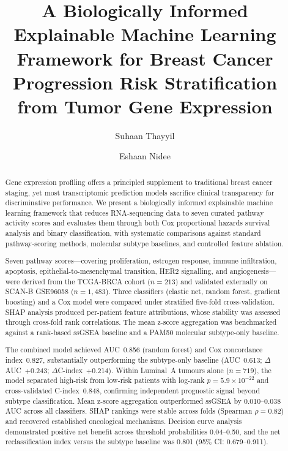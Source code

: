 \documentclass[review,12pt]{elsarticle}
\begin{document}
\begin{frontmatter}
\sloppy

\title{A Biologically Informed Explainable Machine Learning Framework
for Breast Cancer Progression Risk Stratification from Tumor
Gene Expression}

\author[1]{Suhaan Thayyil}

\author[2]{Eshaan Nidee}




\begin{abstract}
Gene expression profiling offers a principled supplement to traditional
breast cancer staging, yet most transcriptomic prediction models sacrifice
clinical transparency for discriminative performance.  We present a
biologically informed explainable machine learning framework that
reduces RNA-sequencing data to seven curated pathway activity scores and
evaluates them through both Cox proportional hazards survival analysis
and binary classification, with systematic comparisons against standard
pathway-scoring methods, molecular subtype baselines, and controlled
feature ablation.

Seven pathway scores---covering proliferation, estrogen response, immune
infiltration, apoptosis, epithelial-to-mesenchymal transition, HER2
signalling, and angiogenesis---were derived from the TCGA-BRCA cohort
(\(n = 213\)) and validated externally on SCAN-B GSE96058 (\(n = 1{,}483\)).
Three classifiers (elastic net, random forest, gradient boosting) and a
Cox model were compared under stratified five-fold cross-validation.
SHAP analysis produced per-patient feature attributions, whose stability
was assessed through cross-fold rank correlations.  The mean z-score
aggregation was benchmarked against a rank-based ssGSEA baseline and a
PAM50 molecular subtype-only baseline.

The combined model achieved AUC~0.856 (random forest) and Cox
concordance index~0.827, substantially outperforming the subtype-only
baseline (AUC~0.613; $\Delta$AUC~$+$0.243; $\Delta$C-index~$+$0.214).
Within Luminal~A tumours alone (\(n = 719\)), the model separated
high-risk from low-risk patients with log-rank
\(p = 5.9 \times 10^{-22}\) and cross-validated C-index~0.848, confirming
independent prognostic signal beyond subtype classification.  Mean
z-score aggregation outperformed ssGSEA by 0.010--0.038 AUC across all
classifiers.  SHAP rankings were stable across folds (Spearman
\(\rho = 0.82\)) and recovered established oncological mechanisms.
Decision curve analysis demonstrated positive net benefit across
threshold probabilities 0.04--0.50, and the net reclassification index
versus the subtype baseline was 0.801 (95\% CI: 0.679--0.911).


\end{abstract}
\end{frontmatter}
\end{document}
